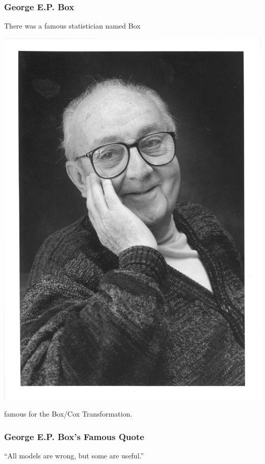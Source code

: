 \documentclass[handout]{beamer}
\newcommand{\blue}[1]{\textcolor{blue2}{#1}}
\begin{document}
\begin{frame}[fragile]
\frametitle{George E.P. Box}
There was a famous statistician named Box
\begin{center}
\includegraphics[height=0.7\textheight]{figure/GeorgeEPBox.jpg}
\end{center}
famous for the Box/Cox Transformation.  
\end{frame}


\begin{frame}[fragile]
\frametitle{George E.P. Box's Famous Quote}

\blue{``All models are wrong, but some are useful.''}

\end{frame}
\end{document}
